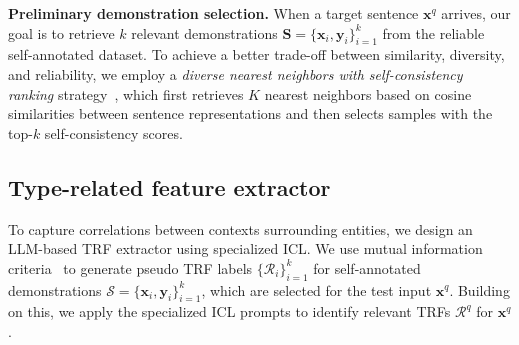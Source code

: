 \noindent \textbf{Preliminary demonstration selection.}
When a target sentence $\mathbf{x}^q$ arrives, our goal is to retrieve $k$ relevant demonstrations $\mathbf{S}=\{\mathbf{x}_{i},\mathbf{y}_{i}\}_{i=1}^k$ from the reliable self-annotated dataset. 
To achieve a better trade-off between similarity, diversity, and reliability, we employ a \emph{diverse nearest neighbors with self-consistency ranking} strategy~\citep{DBLP:journals/corr/abs-2311-08921}, which first retrieves $K$ nearest neighbors based on cosine similarities between sentence representations and then selects samples with the top-$k$ self-consistency scores.


\subsection{Type-related feature extractor}
\label{subsec:TRF extractor-chapter5}
To capture correlations between contexts surrounding entities, we design an \ac{LLM}-based \acf{TRF} extractor using specialized \acf{ICL}.
We use mutual information criteria~\citep{DBLP:conf/emnlp/WangZCRRR23} to generate pseudo \ac{TRF} labels $\{\mathcal{R}_{i}\}_{i=1}^k$ for self-annotated demonstrations $\mathcal{S}=\{\mathbf{x}_{i},\mathbf{y}_{i}\}^k_{i=1}$, which are selected for the test input $\mathbf{x}^q$. Building on this, we apply the specialized \ac{ICL} prompts to identify relevant \acp{TRF} $\mathcal{R}^{q}$ for $\mathbf{x}^q$.




